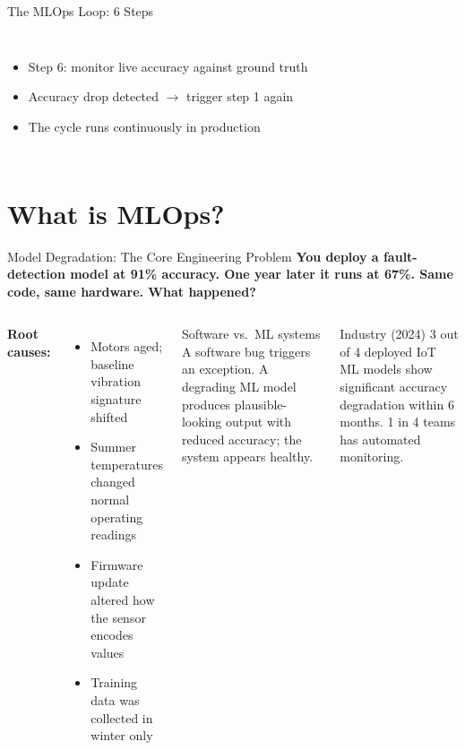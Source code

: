 \documentclass[aspectratio=169,11pt]{beamer}
\begin{document}
\begin{frame}{The MLOps Loop: 6 Steps}
\begin{columns}
        \begin{itemize}\setlength{\itemsep}{6pt}
            \item Step 6: monitor live accuracy against ground truth
            \item Accuracy drop detected $\rightarrow$ trigger step 1 again
            \item The cycle runs continuously in production
        \end{itemize}
    \end{columns}
\end{frame}

\section{What is MLOps?}

\begin{frame}{Model Degradation: The Core Engineering Problem}
    \small
    \textbf{You deploy a fault-detection model at 91\% accuracy. One year later it runs at 67\%. Same code, same hardware. What happened?}

    \vspace{0.2cm}
    \begin{columns}
        \textbf{Root causes:}
        \begin{itemize}\setlength{\itemsep}{4pt}
            \item Motors aged; baseline vibration signature shifted
            \item Summer temperatures changed normal operating readings
            \item Firmware update altered how the sensor encodes values
            \item Training data was collected in winter only
        \end{itemize}

        \begin{exampleblock}{Software vs.\ ML systems}
            A software bug triggers an exception. A degrading ML model produces plausible-looking output with reduced accuracy; the system appears healthy.
        \end{exampleblock}

        \vspace{0.2cm}
        \begin{alertblock}{Industry (2024)}
            3 out of 4 deployed IoT ML models show significant accuracy degradation within 6 months. 1 in 4 teams has automated monitoring.
        \end{alertblock}
    \end{columns}
\end{frame}
\end{document}

